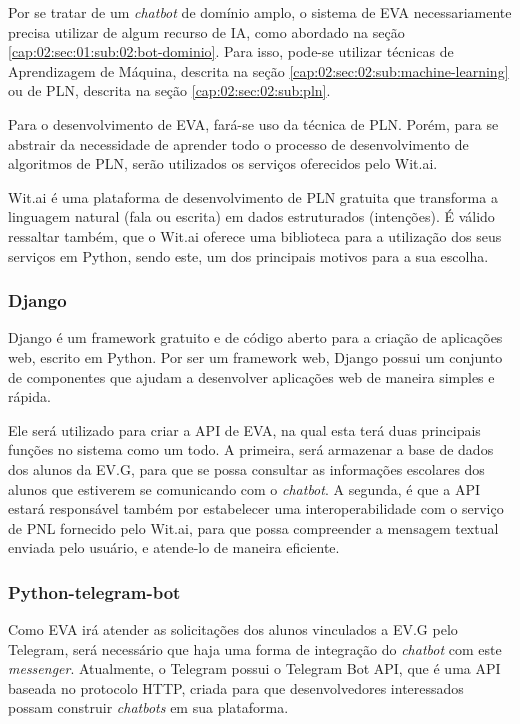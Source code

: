 Por se tratar de um \textit{chatbot} de domínio amplo, o sistema de EVA necessariamente precisa utilizar de algum recurso de IA, como abordado na seção \ref{cap:02:sec:01:sub:02:bot-dominio}. Para isso, pode-se utilizar técnicas de Aprendizagem de Máquina, descrita na seção \ref{cap:02:sec:02:sub:machine-learning} ou de PLN, descrita na seção \ref{cap:02:sec:02:sub:pln}.

Para o desenvolvimento de EVA, fará-se uso da técnica de PLN. Porém, para se abstrair da necessidade de aprender todo o processo de desenvolvimento de algoritmos de PLN, serão utilizados os serviços oferecidos pelo Wit.ai.

 Wit.ai é uma plataforma de desenvolvimento de PLN gratuita que transforma a linguagem natural (fala ou escrita) em dados estruturados (intenções). É válido ressaltar também, que o Wit.ai oferece uma biblioteca para a utilização dos seus serviços em Python, sendo este, um dos principais motivos para a sua escolha.

\subsubsection{Django}

Django é um framework gratuito e de código aberto para a criação de aplicações web, escrito em Python. Por ser um framework web, Django possui um conjunto de componentes que ajudam a desenvolver aplicações web de maneira simples e rápida.

Ele será utilizado para criar a API de EVA, na qual esta terá duas principais funções no sistema como um todo. A primeira, será armazenar a base de dados dos alunos da EV.G, para que se possa consultar as informações escolares dos alunos que estiverem se comunicando com o \textit{chatbot}. A segunda, é que a API estará responsável também por estabelecer uma interoperabilidade com o serviço de PNL fornecido pelo Wit.ai, para que possa compreender a mensagem textual enviada pelo usuário, e atende-lo de maneira eficiente.

\subsubsection{Python-telegram-bot}

Como EVA irá atender as solicitações dos alunos vinculados a EV.G pelo Telegram, será necessário que haja uma forma de integração do \textit{chatbot} com este \textit{messenger}. Atualmente, o Telegram possui o Telegram Bot API, que é uma API baseada no protocolo HTTP, criada para que desenvolvedores interessados possam construir \textit{chatbots} em sua plataforma.

